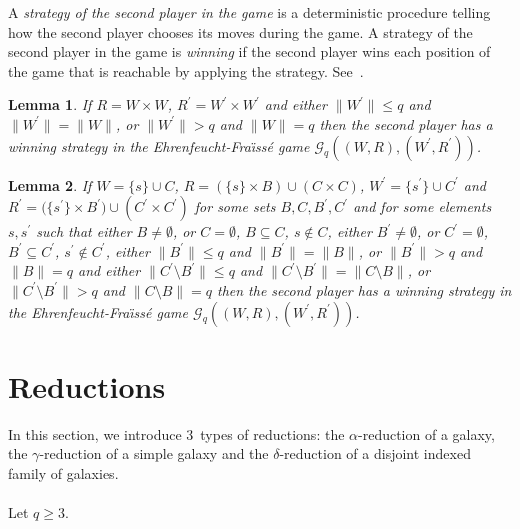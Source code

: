 \documentclass[draft]{article}
\newtheorem{lemma}{Lemma}
\begin{document}
%
%
A {\it strategy of the second player in the game}\/ is a deterministic procedure telling how the second player chooses its moves during the game.
%
%
%
%
A strategy of the second player in the game is {\it winning}\/ if the second player wins each position of the game that is reachable by applying the strategy.
See~\cite[Chapter~$2$]{Ebbinghaus:Flum:1999}.
%
%
\begin{lemma}\label{lemma:about:partitions:q:greater:smaller:games}
%
%
If $R{=}W{\times}W$, $R^{\prime}{=}W^{\prime}{\times}W^{\prime}$ and either ${\parallel}W^{\prime}{\parallel}{\leq}q$ and ${\parallel}W^{\prime}{\parallel}{=}{\parallel}W{\parallel}$, or ${\parallel}W^{\prime}{\parallel}{>}q$ and ${\parallel}W{\parallel}{=}q$ then the second player has a winning strategy in the Ehrenfeucht-Fra\"\i ss\'e game ${\mathcal G}_{q}((W,R),(W^{\prime},R^{\prime}))$.
%
%
\end{lemma}
%
%
\begin{lemma}\label{lemma:about:frames:C:B:smaller:greater:games}
%
%
If $W{=}\{s\}{\cup}C$, $R{=}(\{s\}{\times}B){\cup}(C{\times}C)$, $W^{\prime}{=}\{s^{\prime}\}{\cup}C^{\prime}$ and $R^{\prime}{=}(\{s^{\prime}\}{\times}
%
%
%
%
%
%
%
%
%
%
%
%
$\linebreak$
%
%
%
%
%
%
%
%
%
%
%
%
B^{\prime}){\cup}(C^{\prime}{\times}C^{\prime})$ for some sets $B,C,B^{\prime},C^{\prime}$ and for some elements $s,s^{\prime}$ such that either $B{\not=}\emptyset$, or $C{=}\emptyset$, $B{\subseteq}C$, $s{\not\in}C$, either $B^{\prime}{\not=}\emptyset$, or $C^{\prime}{=}\emptyset$, $B^{\prime}{\subseteq}C^{\prime}$, $s^{\prime}{\not\in}C^{\prime}$, either ${\parallel}B^{\prime}{\parallel}{\leq}q$ and ${\parallel}B^{\prime}{\parallel}{=}{\parallel}B{\parallel}$, or ${\parallel}B^{\prime}{\parallel}{>}q$ and ${\parallel}B{\parallel}{=}q$ and either ${\parallel}C^{\prime}{\setminus}B^{\prime}{\parallel}{\leq}q$ and ${\parallel}C^{\prime}{\setminus}B^{\prime}{\parallel}{=}{\parallel}C{\setminus}B{\parallel}$, or ${\parallel}C^{\prime}{\setminus}B^{\prime}{\parallel}{>}q$ and ${\parallel}C{\setminus}B{\parallel}{=}q$ then the second player has a winning strategy in the Ehrenfeucht-Fra\"\i ss\'e game ${\mathcal G}_{q}((W,R),(W^{\prime},R^{\prime}))$.
%
%
\end{lemma}
%
%
%
%
\section{Reductions}
%
%
In this section, we introduce $3$~types of reductions: the $\alpha$-reduction of a galaxy, the $\gamma$-reduction of a simple galaxy and the $\delta$-reduction of a disjoint indexed family of galaxies.
%
%
\\
\\
%
%
Let $q{\geq}3$.
%
%
%
%
\end{document}
